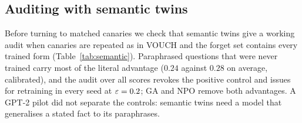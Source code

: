 \subsection{Auditing with semantic twins}\label{sec:exp-semantic}


Before turning to matched canaries we check that semantic twins give a working audit when
canaries are repeated as in VOUCH and the forget set contains every trained form
(Table~\ref{tab:semantic}). Paraphrased questions that were never trained carry most of the
literal advantage ($0.24$ against $0.28$ on average, calibrated), and the audit over all
scores revokes the positive control and issues for retraining in every seed at $\varepsilon=0.2$;
GA and NPO remove both advantages. A GPT-2 pilot did not separate the controls: semantic
twins need a model that generalises a stated fact to its paraphrases.

\begin{table}[t]
\centering\footnotesize\setlength{\tabcolsep}{2.5pt}
\caption{Semantic-twin audit on Pythia-410M, full forget set, $m=384$, three seeds: realised
calibrated literal and paraphrase advantages per seed and the two-sided verdict (I issued, R
revoked, U undetermined).}
\label{tab:semantic}
\resizebox{\columnwidth}{!}{}
\end{table}


